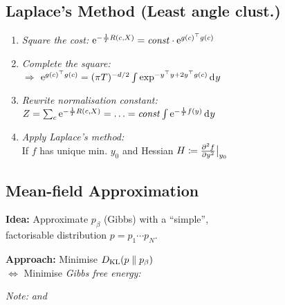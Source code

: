 \subsection{Laplace's Method \quad\normalfont\sffamily (Least angle clust.)}

\begin{enumerate}
    \item \textit{Square the cost:}\quad
        $\mathrm{e}^{-\frac1T R(c,X)} = \mathit{const} \cdot \mathrm{e}^{g(c)^\top g(c)}$
    \item \textit{Complete the square:}\quad
        \\
        $\Rightarrow$ $\eu^{g(c)^\top g(c)} = (\pi T)^{-d/2} \int \exp^{-y^\top y + 2 y^\top g(c)} \diff y$
    \item \textit{Rewrite normalisation constant:}\\
        $Z = \sum_c \eu^{-\frac1T R(c,X)} = \ldots = \mathit{const} \int \eu^{-\frac1T f(y)} \diff y$
    \item \textit{Apply Laplace's method:}\\\vspace{-2pt}
        If $f$ has unique min. $y_0$ and Hessian $H\coloneqq \pderiv[2]{f}{y}\big\vert_{y_0}$\\\vspace{-2pt}
\end{enumerate}


\subsection{Mean-field Approximation}

\textbf{Idea:}\enskip
Approximate $p_\beta$ (Gibbs) with a ``simple'', \\\enskip
factorisable distribution $p = p_1 \cdots p_N$.

\textbf{Approach:}\enskip
Minimise $D_\mathrm{KL}(p\parallel p_\beta)$\\
$\iff$ Minimise \emph{Gibbs free energy:}\\
\hfill {}

\quad \textit{Note:}\enskip
{} \enskip \textit{and} \enskip {}

